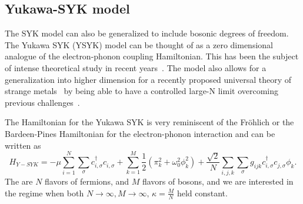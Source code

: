 \subsection{Yukawa-SYK model}
The SYK model can also be generalized to include bosonic degrees of freedom. The Yukawa SYK (YSYK) model can be thought of as a zero dimensional analogue of the electron-phonon coupling Hamiltonian. This has been the subject of intense theoretical study in recent years~\cite{esterlis2019cooper,wang2020quantum,wang2020solvable,classen2021superconductivity,inkof2022quantum,pan2021yukawa,davis2023quantum,grunwald2024dynamical,choi2022pairing}. The model also allows for a generalization into higher dimension for a recently proposed universal theory of strange metals~\cite{patel2023universal,valentinis2023correlation,esterlis2021large,guo2022large,guo2023large,li2024strange} by being able to have a controlled large-N limit overcoming previous challenges~\cite{lee2009low}.

\par
The Hamiltonian for the Yukawa SYK is very reminiscent of the Fr\"ohlich or the Bardeen-Pines Hamiltonian for the electron-phonon interaction and can be written as 
\begin{equation}
    H_{Y-SYK} = -\mu\sum_{i=1}^N\sum_\sigma c^\dagger_{i,\sigma} c^{\phantom{\dagger}}_{i, \sigma} + \sum_{k=1}^M \frac{1}{2}\left(\pi_k^2 + \omega_0^2\phi_k^2\right) + \frac{\sqrt{2}}{N}\sum_{i,j,k}\sum_{\sigma}g_{ijk} c^\dagger_{i,\sigma} c^{\phantom{\dagger}}_{j,\sigma} \phi^{\phantom{\dagger}}_k .
    \label{eq:intrHYSYK}
\end{equation}
The are $N$ flavors of fermions, and $M$ flavors of bosons, and we are interested in the regime when both $N\rightarrow\infty, M\rightarrow\infty, \, \kappa = \frac{M}{N}$ held constant. 

